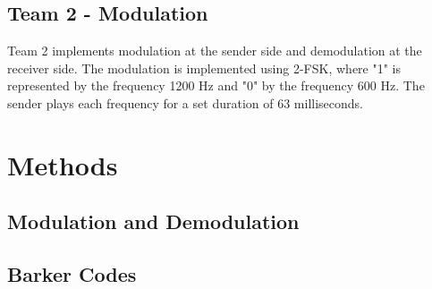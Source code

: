 \subsection{Team 2 - Modulation}
Team 2 implements modulation at the sender side and demodulation at the receiver side. The modulation is implemented using 2-FSK, where "1" is represented by the frequency 1200 Hz and "0" by the frequency 600 Hz. The sender plays each frequency for a set duration of 63 milliseconds.


\section{Methods}
\subsection{Modulation and Demodulation}
\subsection{Barker Codes}
